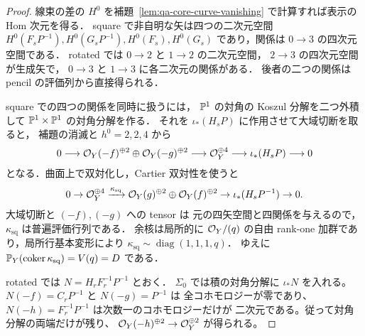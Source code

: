 \begin{proof}
線束の差の $H^0$ を補題~\ref{lem:qa-core-curve-vanishing}
で計算すれば表示の Hom 次元を得る．
square で非自明な矢は四つの二次元空間
$H^0(F_sP^{-1}),H^0(G_sP^{-1}),H^0(F_s),H^0(G_s)$
であり，関係は $0\to3$ の四次元空間である．
rotated では $0\to2$ と $1\to2$ の二次元空間，
$2\to3$ の四次元空間が生成矢で，
$0\to3$ と $1\to3$ に各二次元の関係がある．
後者の二つの関係は pencil の評価列から直接得られる．

square での四つの関係を同時に扱うには，
$\mathbb P^1$ の対角の Koszul 分解を二つ外積して
$\mathbb P^1\times\mathbb P^1$ の対角分解を作る．
それを $\iota_*(H_sP)$ に作用させて大域切断を取ると，
補題の消滅と $h^0=2,2,4$ から
\[
 0\longrightarrow\mathcal O_Y(-f)^{\oplus2}
       \oplus\mathcal O_Y(-g)^{\oplus2}
 \longrightarrow\mathcal O_Y^{\oplus4}
 \longrightarrow\iota_*(H_sP)\longrightarrow0
\]
となる．曲面上で双対化し，Cartier 双対性を使うと
\begin{equation}
0\to\mathcal O_Y^{\oplus4}
 \xrightarrow{\kappa_{\mathrm{sq}}}
 \mathcal O_Y(g)^{\oplus2}\oplus\mathcal O_Y(f)^{\oplus2}
 \to\iota_*(H_sP^{-1})\to0 .
\label{eq:qa-core-square-matrix}
\end{equation}
大域切断と $(-f),(-g)$ への tensor は
元の四矢空間と四関係を与えるので，
$\kappa_{\mathrm{sq}}$ は普遍評価行列である．
余核は局所的に $\mathcal O_Y/(q)$ の自由 rank-one
加群であり，局所行基本変形により
$\kappa_{\mathrm{sq}}\sim\operatorname{diag}(1,1,1,q)$．
ゆえに $\mathbb P_Y(\operatorname{coker}\kappa_{\mathrm{sq}})=V(q)=D$ である．

rotated では $N=H_rF_r^{-1}P^{-1}$ とおく．
$\Sigma_0$ では積の対角分解に $\iota_*N$ を入れる。
$N(-f)=C_rP^{-1}$ と $N(-g)=P^{-1}$ は
全コホモロジーが零であり、
$N(-h)=F_r^{-1}P^{-1}$ は次数一のコホモロジーだけが
二次元である。従って対角分解の両端だけが残り、
$\mathcal O_Y(-h)^{\oplus2}\to\mathcal O_Y^{\oplus2}$ が得られる。


\end{proof}
